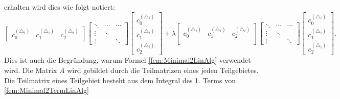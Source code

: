 erhalten wird dies wie folgt notiert:
\begin{equation}
\begin{bmatrix}
c_0^{(\triangle_i)} &  c_1^{(\triangle_i)} &  c_2^{(\triangle_i)}  
\end{bmatrix}
\begin{bmatrix}
\ddots & \cdots &  \cdots    \\
\vdots & \ddots &   \\
\vdots &  & \ddots
\end{bmatrix}
\begin{bmatrix}
c_0^{(\triangle_i)}  \\
c_1^{(\triangle_i)} \\
c_2^{(\triangle_i)}
\end{bmatrix}
+
\lambda
\begin{bmatrix}
c_0^{(\triangle_i)} &  c_1^{(\triangle_i)} &  c_2^{(\triangle_i)}    \\   
\end{bmatrix}
\begin{bmatrix}
\ddots & \cdots &  \cdots    \\
\vdots & \ddots &   \\
\vdots &  & \ddots
\end{bmatrix}
\begin{bmatrix}
c_0^{(\triangle_i)}  \\
c_1^{(\triangle_i)} \\
c_2^{(\triangle_i)}
\end{bmatrix}.
	\label{fem:MatrixKoeffizient}
\end{equation}
Dies ist auch die Begründung, warum Formel \eqref{fem:Minimal2LinAlg}
verwendet wird.
Die Matrix $A$ wird gebildet durch die Teilmatrizen eines jeden Teilgebietes.
Die Teilmatrix eines Teilgebiet besteht  aus dem Integral des 1.
Terms von \eqref{fem:Minimal2TermLinAlg}

